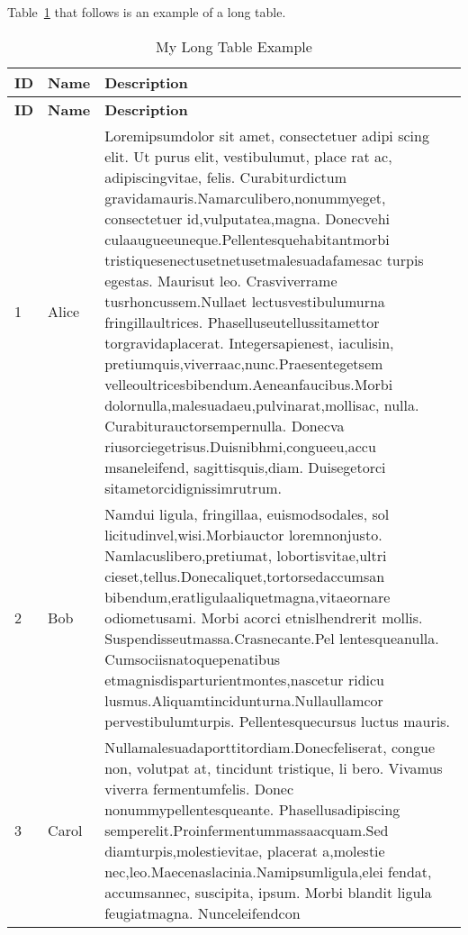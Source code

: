 Table~\ref{tab:longexample} that follows is an example of a long table.
\begin{center}
\begin{longtable}{|p{}|p{}|p{}|}
\caption{My Long Table Example} \label{tab:longexample} \\
\hline
\textbf{ID} & \textbf{Name} & \textbf{Description} \\
\hline
\endfirsthead

\hline
\textbf{ID} & \textbf{Name} & \textbf{Description} \\
\hline
\endhead

\hline
\endfoot

\hline
\endlastfoot

1 & Alice & Loremipsumdolor sit amet, consectetuer adipi
scing elit. Ut purus elit, vestibulumut, place
rat ac, adipiscingvitae, felis. Curabiturdictum
 gravidamauris.Namarculibero,nonummyeget,
 consectetuer id,vulputatea,magna. Donecvehi
culaaugueeuneque.Pellentesquehabitantmorbi
 tristiquesenectusetnetusetmalesuadafamesac
 turpis egestas. Maurisut leo. Crasviverrame
tusrhoncussem.Nullaet lectusvestibulumurna
 fringillaultrices. Phaselluseutellussitamettor
torgravidaplacerat. Integersapienest, iaculisin,
 pretiumquis,viverraac,nunc.Praesentegetsem
 velleoultricesbibendum.Aeneanfaucibus.Morbi
 dolornulla,malesuadaeu,pulvinarat,mollisac,
 nulla. Curabiturauctorsempernulla. Donecva
riusorciegetrisus.Duisnibhmi,congueeu,accu
msaneleifend, sagittisquis,diam. Duisegetorci
 sitametorcidignissimrutrum. \\
2 & Bob & Namdui ligula, fringillaa, euismodsodales, sol
licitudinvel,wisi.Morbiauctor loremnonjusto.
 Namlacuslibero,pretiumat, lobortisvitae,ultri
cieset,tellus.Donecaliquet,tortorsedaccumsan
 bibendum,eratligulaaliquetmagna,vitaeornare
 odiometusami. Morbi acorci etnislhendrerit
 mollis. Suspendisseutmassa.Crasnecante.Pel
lentesqueanulla. Cumsociisnatoquepenatibus
 etmagnisdisparturientmontes,nascetur ridicu
lusmus.Aliquamtincidunturna.Nullaullamcor
pervestibulumturpis. Pellentesquecursus luctus
 mauris. \\
3 & Carol & Nullamalesuadaporttitordiam.Donecfeliserat,
 congue non, volutpat at, tincidunt tristique, li
bero. Vivamus viverra fermentumfelis. Donec
 nonummypellentesqueante. Phasellusadipiscing
 semperelit.Proinfermentummassaacquam.Sed
 diamturpis,molestievitae, placerat a,molestie
 nec,leo.Maecenaslacinia.Namipsumligula,elei
fendat, accumsannec, suscipita, ipsum. Morbi
 blandit ligula feugiatmagna. Nunceleifendcon

\end{longtable}
\end{center}
